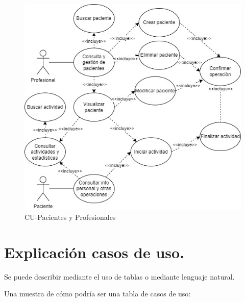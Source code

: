 \begin{figure}[h]
    \centering
    \includegraphics[width=1\textwidth]{img/CUdiagramas/CU-Paciente_Profesional.jpg}
    \caption{CU-Pacientes y Profesionales}
    \label{fig:CU-Paciente_Profesional}
\end{figure}




\section{Explicación casos de uso.}

Se puede describir mediante el uso de tablas o mediante lenguaje natural.    

Una muestra de cómo podría ser una tabla de casos de uso:

